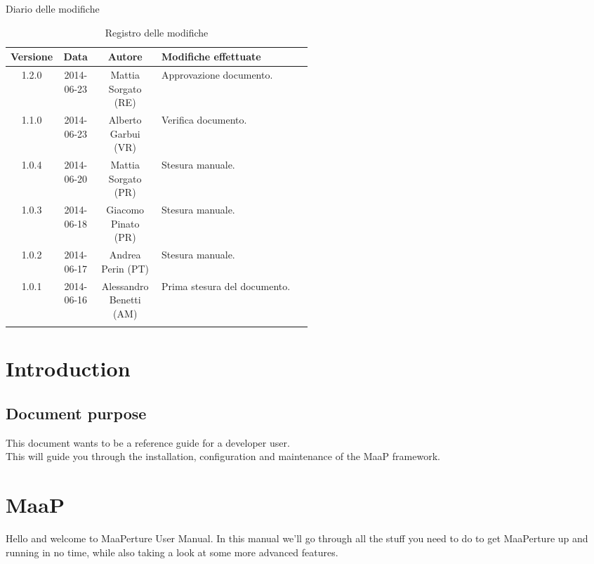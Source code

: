 
\newpage
Diario delle modifiche
\begin{center}
\begin{longtable}{|c|c|c|p{0.5\linewidth}|}
\toprule
\textbf{Versione} & \textbf{Data} & \textbf{Autore} & \textbf{Modifiche effettuate}\\

\midrule
1.2.0 & 2014-06-23 & Mattia Sorgato (RE) & Approvazione documento.\\
\midrule
1.1.0 & 2014-06-23 & Alberto Garbui (VR) & Verifica documento.\\
\midrule
1.0.4 & 2014-06-20 & Mattia Sorgato (PR) & Stesura manuale.\\
\midrule
1.0.3 & 2014-06-18 & Giacomo Pinato (PR) & Stesura manuale.\\
\midrule
1.0.2 & 2014-06-17 & Andrea Perin (PT) & Stesura manuale.\\
\midrule
1.0.1 & 2014-06-16 & Alessandro Benetti (AM) & Prima stesura del documento.\\

\bottomrule
\caption{Registro delle modifiche}
\label{tab:changelog}

\end{longtable}
\end{center}

\newpage
\tableofcontents

\newpage

\newpage
\section{Introduction}
\subsection{Document purpose}
This document wants to be a reference guide for a developer user. \\
This will guide you through the installation, configuration and maintenance of the MaaP framework.

\newpage
\section{MaaP}
Hello and welcome to MaaPerture User Manual.
In this manual we'll go through all the stuff you need to do to get MaaPerture up and running in no time, while also taking a look at some more advanced features.

